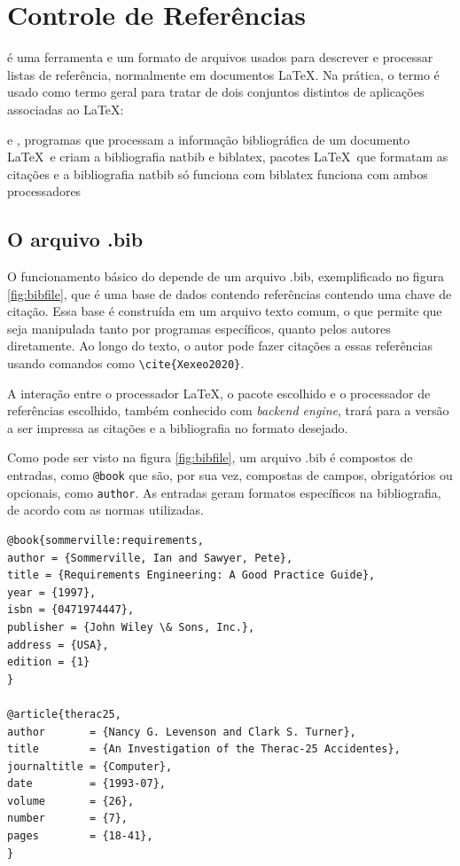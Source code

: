 \chapter{Controle de Referências}

 é uma ferramenta e um formato de arquivos usados para descrever e processar listas de referência,       normalmente em documentos \LaTeX  . Na prática, o termo  é usado como termo geral para tratar de dois conjuntos distintos de aplicações associadas ao \LaTeX:
\begin{outline}
    \1  e , programas que
    processam a informação bibliográfica de um documento \LaTeX\ e criam a bibliografia
    \1 natbib e biblatex, pacotes \LaTeX\ que formatam as citações e a bibliografia
    \2 natbib só funciona com 
    \2 biblatex funciona com ambos processadores
\end{outline}


\section{O arquivo .bib}

O funcionamento básico do   depende de um arquivo .bib, exemplificado no figura \ref{fig:bibfile}, que é uma base de dados contendo  referências contendo uma chave de citação. Essa base é construída em um arquivo texto comum, o que permite que seja manipulada tanto por programas específicos, quanto pelos autores diretamente. Ao longo do texto, o autor pode fazer citações a essas referências usando comandos como \lstinline|\cite{Xexeo2020}|. 

A interação entre o processador \LaTeX, o pacote escolhido e o processador de referências escolhido, também conhecido com \textit{backend engine}, trará para a versão a ser impressa as citações e a bibliografia no formato desejado. 

Como pode ser visto na figura \ref{fig:bibfile}, um arquivo .bib é compostos de entradas, como \lstinline|@book| que são, por sua vez, compostas de campos, obrigatórios ou opcionais, como \lstinline|author|. As entradas geram formatos específicos na bibliografia, de acordo com as normas utilizadas.


\begin{lstlisting}[caption=Exemplo de arquivo .bib,label=fig:bibfile]
@book{sommerville:requirements,
author = {Sommerville, Ian and Sawyer, Pete},
title = {Requirements Engineering: A Good Practice Guide},
year = {1997},
isbn = {0471974447},
publisher = {John Wiley \& Sons, Inc.},
address = {USA},
edition = {1}
}

@article{therac25,
author       = {Nancy G. Levenson and Clark S. Turner},
title        = {An Investigation of the Therac-25 Accidentes},
journaltitle = {Computer},
date         = {1993-07},
volume       = {26},
number       = {7},
pages        = {18-41},
}
\end{lstlisting}


